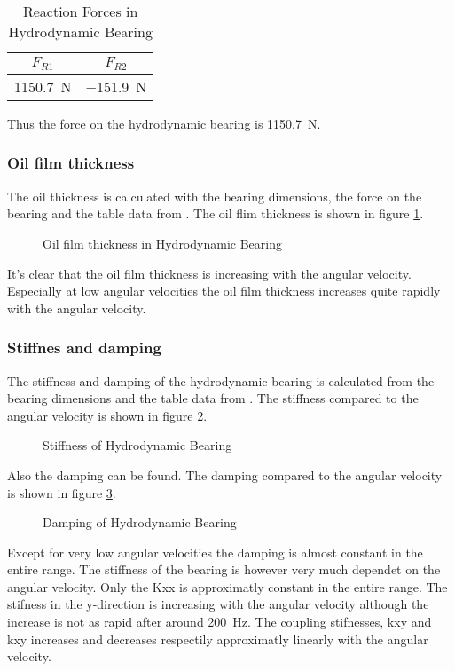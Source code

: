 \begin{table}[htbp]
    \centering
    \caption{Reaction Forces in Hydrodynamic Bearing}
    \label{tab:hydrodynamic_bearing_reactions}
    \begin{tabular}{@{}cc@{}}
        \toprule
        $F_{R1}$    &   $F_{R2}$    \\ \midrule
        \SI{1150.7}{\newton}  &   \SI{-151.9}{\newton}  \\ \bottomrule
    \end{tabular}
\end{table}
Thus the force on the hydrodynamic bearing is \SI{1150.7}{\newton}.

\subsubsection{Oil film thickness}
The oil thickness is calculated with the bearing dimensions, the force on the bearing and the table data from \cite[Table 1a]{Problem}. The oil flim thickness is shown in figure \ref{fig:oil_film_thickness}.
\begin{figure}[htbp]
    \centering
    
    \caption{Oil film thickness in Hydrodynamic Bearing}
    \label{fig:oil_film_thickness}
\end{figure}
It's clear that the oil film thickness is increasing with the angular velocity. Especially at low angular velocities the oil film thickness increases quite rapidly with the angular velocity.

\subsubsection{Stiffnes and damping}
The stiffness and damping of the hydrodynamic bearing is calculated from the bearing dimensions and the table data from \cite[Table 1a]{Problem}. The stiffness compared to the angular velocity is shown in figure \ref{fig:hydrodynamic_bearing_stiffness}.
\begin{figure}[htbp]
    \centering
    
    \caption{Stiffness of Hydrodynamic Bearing}
    \label{fig:hydrodynamic_bearing_stiffness}
\end{figure}
Also the damping can be found. The damping compared to the angular velocity is shown in figure \ref{fig:hydrodynamic_bearing_damping}.
\begin{figure}[htbp]
    \centering
    
    \caption{Damping of Hydrodynamic Bearing}
    \label{fig:hydrodynamic_bearing_damping}
\end{figure}
Except for very low angular velocities the damping is almost constant in the entire range. The stiffness of the bearing is however very much dependet on the angular velocity. Only the Kxx is approximatly constant in the entire range. The stifness in the y-direction is increasing with the angular velocity although the increase is not as rapid after around \SI{200}{\hertz}. The coupling stifnesses, kxy and kxy increases and decreases respectily approximatly linearly with the angular velocity.

